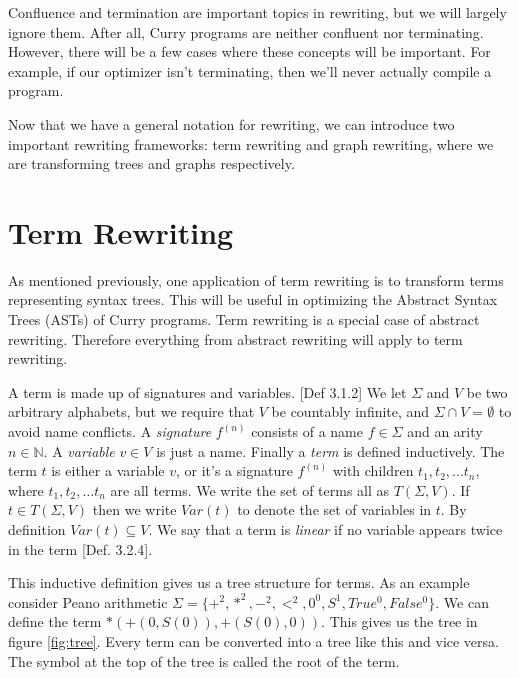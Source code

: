 \documentclass{book}
\theoremstyle{definition}
\begin{document}
Confluence and termination are important topics in rewriting, but we will largely ignore them.
After all, Curry programs are neither confluent nor terminating.
However, there will be a few cases where these concepts will be important.
For example, if our optimizer isn't terminating, then we'll never actually compile a program.

Now that we have a general notation for rewriting, we can introduce two important rewriting frameworks:
term rewriting and graph rewriting, where we are transforming trees and graphs respectively.

\section{Term Rewriting}

As mentioned previously, one application of term rewriting
is to transform terms representing syntax trees.
This will be useful in optimizing the Abstract Syntax Trees (ASTs) of Curry programs.
Term rewriting is a special case of abstract rewriting.
Therefore everything from abstract rewriting will apply to term rewriting.

A term is made up of signatures and variables. \cite{AdvancedTRS}[Def 3.1.2]
We let $\Sigma$ and $V$ be two arbitrary alphabets, 
but we require that $V$ be countably infinite, and $\Sigma \cap V = \emptyset$ to avoid name conflicts.
A \emph{signature} $f^{(n)}$ consists of a name $f \in \Sigma$ and an arity $n\in \mathbb{N}$.
A \emph{variable} $v\in V$ is just a name.
Finally a \emph{term} is defined inductively.
The term $t$ is either a variable $v$, or it's a signature $f^{(n)}$ with children $t_1,t_2, \ldots t_n$,
where $t_1,t_2, \ldots t_n$ are all terms.
We write the set of terms all as $T(\Sigma,V)$.
If $t \in T(\Sigma,V)$ then we write $Var(t)$ to denote the set of variables in $t$.
By definition $Var(t) \subseteq V$.
We say that a term is \emph{linear} if no variable appears twice in the term \cite{AdvancedTRS}[Def. 3.2.4].

This inductive definition gives us a tree structure for terms.
As an example consider Peano arithmetic $\Sigma = \{+^2, *^2, -^2, <^2, 0^0, S^1, True^0, False^0\}$.
We can define the term $*(+(0, S(0)), +(S(0), 0))$.
This gives us the tree in figure \ref{fig:tree}.
Every term can be converted into a tree like this and vice versa.
The symbol at the top of the tree is called the root of the term.
\end{document}
